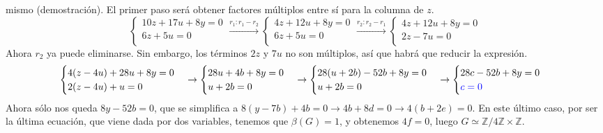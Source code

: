 \documentclass[a4paper, 11pt]{extarticle}
\begin{document}
mismo (demostración). El primer paso será obtener factores múltiplos entre sí para la columna
de \(z\).
$$\begin{cases}
10z+17u+8y=0\\
6z+5u=0\\
\end{cases} \xrightarrow{r_1:r_1-r_2}
\begin{cases}
4z+12u+8y=0\\
6z+5u=0\\
\end{cases} \xrightarrow{r_2:r_2-r_1} 
\begin{cases}
4z+12u+8y=0\\
2z-7u=0\\
\end{cases}$$
Ahora \(r_2\) ya puede eliminarse. Sin embargo, los términos \(2z\) y \(7u\)
 no son múltiplos, así que habrá que reducir la expresión.
$$\begin{cases}
4(z-4u)+28u+8y=0\\
2(z-4u)+u=0\\
\end{cases}
\rightarrow 
\begin{cases}
28u+4b+8y=0\\
u+2b=0\\
\end{cases}
 \rightarrow 
\begin{cases}
28(u+2b)-52b+8y=0\\
u+2b=0\\
\end{cases}
\rightarrow 
\begin{cases}
28c-52b+8y=0\\
\textcolor{blue}{c=0}\\
\end{cases}$$
Ahora sólo nos queda \(8y-52b=0\), que se simplifica a \(8(y-7b) + 4b=0
\rightarrow 4b+8d = 0 \rightarrow 4(b+2e)=0\). En este último caso, por ser la
última ecuación, que viene dada por dos variables, tenemos que \(\beta(G) = 1\), y obtenemos \(4f=0\), luego \(G \simeq \mathbb{Z}/ 4 \mathbb{Z} \times
\mathbb{Z}\).
\end{document}
